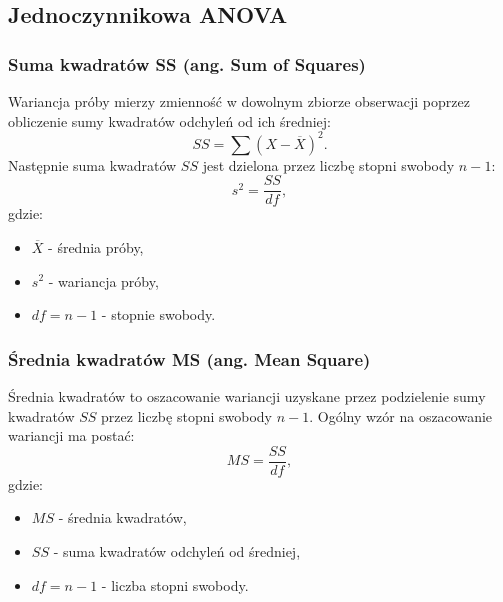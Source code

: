 \documentclass{article}
\begin{document}
\newpage
\subsection{Jednoczynnikowa ANOVA}

\subsubsection{Suma kwadratów SS (ang. Sum of Squares)}
Wariancja próby mierzy zmienność w dowolnym zbiorze obserwacji poprzez obliczenie sumy kwadratów odchyleń od ich średniej:
$$SS=\sum(X-\overline{X})^2.$$
Następnie suma kwadratów $SS$ jest dzielona przez liczbę stopni swobody $n-1$:
$$s^2=\frac{SS}{df},$$
gdzie:
\begin{itemize}
    \item $\overline{X}$ - średnia próby,
    \item $s^2$ - wariancja próby,
    \item $df=n-1$ - stopnie swobody.
\end{itemize}

\subsubsection{Średnia kwadratów MS (ang. Mean Square)}
Średnia kwadratów to oszacowanie wariancji uzyskane przez podzielenie sumy kwadratów $SS$ przez liczbę stopni swobody $n-1$.
Ogólny wzór na oszacowanie wariancji ma postać:
$$MS=\frac{SS}{df},$$
gdzie:
\begin{itemize}
    \item $MS$ - średnia kwadratów,
    \item $SS$ - suma kwadratów odchyleń od średniej,
    \item $df = n-1$ - liczba stopni swobody.
\end{itemize}

\newpage
\end{document}
